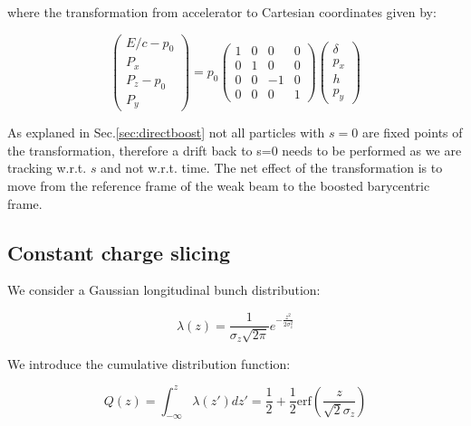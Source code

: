 \begin{appendices}
where the transformation from accelerator to Cartesian coordinates given by:

\begin{equation}
\left( \begin{matrix}
E/c-p_0\\
P_x\\
P_z-p_0\\
P_y
\end{matrix} \right) = p_0
\left( \begin{matrix}
1 &0 &0&0\\
0 &1&0 &0\\
0 &0&-1 &0\\
0 &0 &0&1
\end{matrix} \right)
\left( \begin{matrix}
\delta\\
p_x\\
h\\
p_y
\end{matrix} \right) 
\end{equation}

As explaned in Sec.\ref{sec:directboost} not all particles with $s=0$ are fixed points of the transformation, therefore a drift  back to s=0 needs to be performed as we are tracking w.r.t. $s$ and not w.r.t. time. The net effect of the transformation is to move from the reference frame of the weak beam to the boosted barycentric frame.

%

\subsection{Constant charge slicing}
\label{app:slicing}
We consider a Gaussian longitudinal bunch distribution:

\begin{equation}
\lambda(z) = \frac{1}{\sigma_z \sqrt{2\pi}}e^{-\frac{z^2}{2\sigma_z^2}} 
\end{equation}

We introduce the cumulative distribution function:

\begin{equation}
Q(z) = \int_{-\infty}^{z} \lambda(z')dz' = \frac{1}{2}+\frac{1}{2}\mathrm{erf}\left(\frac{z}{\sqrt{2}\sigma_z}\right)
\label{cumul}
\end{equation}


\end{appendices}
